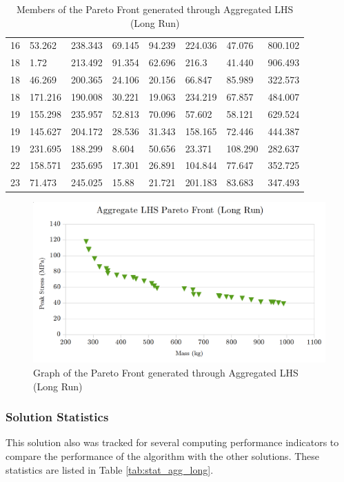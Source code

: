 \begin{table}[!htbp]
\begin{tabular}{|p{1.5cm}p{1.5cm}p{1.5cm}p{1.4cm}p{2cm}p{2cm}p{1.5cm}p{1.5cm}|}
16&53.262&238.343&69.145&94.239&224.036&47.076&800.102\\
18&1.72&213.492&91.354&62.696&216.3&41.440&906.493\\
18&46.269&200.365&24.106&20.156&66.847&85.989&322.573\\
18&171.216&190.008&30.221&19.063&234.219&67.857&484.007\\
19&155.298&235.957&52.813&70.096&57.602&58.121&629.524\\
19&145.627&204.172&28.536&31.343&158.165&72.446&444.387\\
19&231.695&188.299&8.604&50.656&23.371&108.290&282.637\\
22&158.571&235.695&17.301&26.891&104.844&77.647&352.725\\
23&71.473&245.025&15.88&21.721&201.183&83.683&347.493\\
\hline
\end{tabular}
\caption{Members of the Pareto Front generated through Aggregated LHS (Long Run)}
\label{tab:pfront_agg_long}
\end{table}

\begin{figure}[!hbp]
\includegraphics[width=\textwidth]{img/pf_agg_long.png}
\caption{Graph of the Pareto Front generated through Aggregated LHS (Long Run)}
\label{fig:pfront_agg_long}
\end{figure}

\subsubsection{Solution Statistics}
This solution also was tracked for several computing performance indicators to compare the performance of the algorithm with the other solutions. These statistics are listed in Table \ref{tab:stat_agg_long}. 

